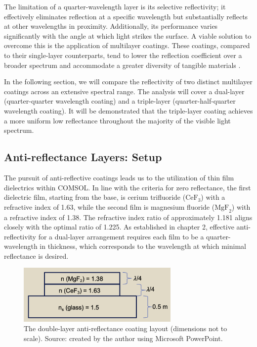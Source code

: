 The limitation of a quarter-wavelength layer is its selective reflectivity; it effectively eliminates reflection at a specific wavelength but substantially reflects at other wavelengths in proximity. Additionally, its performance varies significantly with the angle at which light strikes the surface. A viable solution to overcome this is the application of multilayer coatings. These coatings, compared to their single-layer counterparts, tend to lower the reflection coefficient over a broader spectrum and accommodate a greater diversity of tangible materials \cite{pedrotti_introduction_2007}.

In the following section, we will compare the reflectivity of two distinct multilayer coatings across an extensive spectral range. The analysis will cover a dual-layer (quarter-quarter wavelength coating) and a triple-layer (quarter-half-quarter wavelength coating). It will be demonstrated that the triple-layer coating achieves a more uniform low reflectance throughout the majority of the visible light spectrum.


\subsection{Anti-reflectance Layers: Setup}

The pursuit of anti-reflective coatings leads us to the utilization of thin film dielectrics within COMSOL. In line with the criteria for zero reflectance, the first dielectric film, starting from the base, is cerium trifluoride ($\text{CeF}_3$) with a refractive index of 1.63, while the second film is magnesium fluoride ($\text{MgF}_2$) with a refractive index of 1.38. The refractive index ratio of approximately 1.181 aligns closely with the optimal ratio of 1.225. As established in chapter 2, effective anti-reflectivity for a dual-layer arrangement requires each film to be a quarter-wavelength in thickness, which corresponds to the wavelength at which minimal reflectance is desired.

\begin{figure}[H]
  \centering
  \includegraphics[width=0.7\textwidth]{Chapters/Figures/Chapter 4 Figures/Antireflective Double-Layer (PowerPoint).png}
  \caption{The double-layer anti-reflectance coating layout (dimensions not to scale). Source: created by the author using Microsoft PowerPoint.}
  \label{fig:Antireflective Double-Layer (PowerPoint)}
\end{figure}

